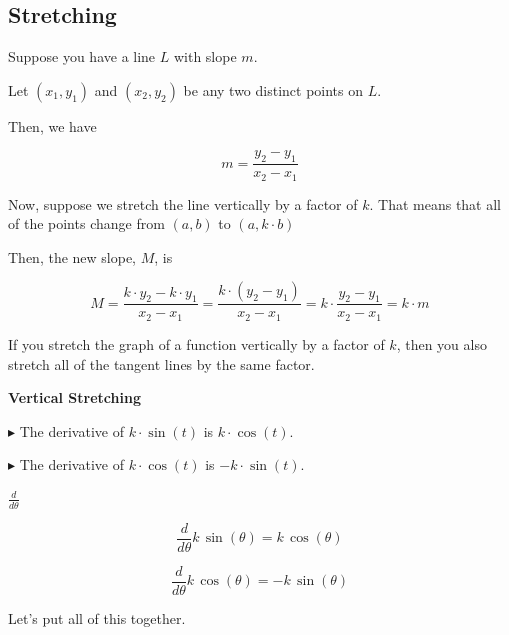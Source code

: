 \documentclass{ximera}
\begin{document}
\subsection*{Stretching}


Suppose you have a line $L$ with slope $m$. 

Let $(x_1, y_1)$ and $(x_2, y_2)$ be any two distinct points on $L$. 

Then, we have


\[
m = \frac{y_2 - y_1}{x_2 - x_1}
\]






Now, suppose we stretch the line vertically by a factor of $k$.  That means that all of the points change from $(a, b)$ to $(a, k \cdot b)$

Then, the new slope, $M$, is 



\[
M = \frac{k \cdot y_2 - k \cdot y_1}{x_2 - x_1} = \frac{k \cdot (y_2 - y_1)}{x_2 - x_1} = k \cdot \frac{y_2 - y_1}{x_2 - x_1} = k \cdot m
\]


If you stretch the graph of a function vertically by a factor of $k$, then you also stretch all of the tangent lines by the same factor.


\begin{observation} \textbf{\textcolor{-red!75}{Vertical Stretching}}   

$\blacktriangleright$ The derivative of $k \cdot \sin(t)$ is $k \cdot \cos(t)$. 

$\blacktriangleright$ The derivative of $k \cdot \cos(t)$ is $-k \cdot \sin(t)$. 

\end{observation}




\begin{notation} \textbf{\textcolor{red!50!green}{$\frac{d}{d\theta}$}} 

\[
\frac{d}{d\theta} k \, \sin(\theta) = k \, \cos(\theta)
\]

\[
\frac{d}{d\theta} k \, \cos(\theta) = -k \, \sin(\theta)
\]

\end{notation}








Let's put all of this together.
\end{document}
